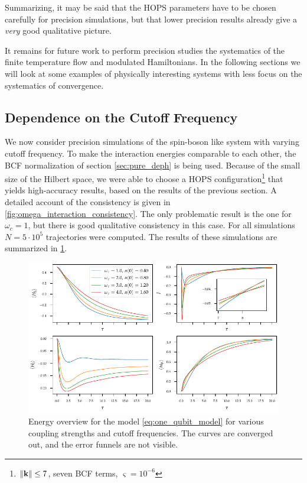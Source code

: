 Summarizing, it may be said that the HOPS parameters have to be chosen
carefully for precision simulations, but that lower precision results
already give a \emph{very} good qualitative picture.

It remains for future work to perform precision studies the
systematics of the finite temperature flow and modulated
Hamiltonians. In the following sections we will look at some examples
of physically interesting systems with less focus on the systematics
of convergence.

\subsection{Dependence on the Cutoff Frequency}
\label{sec:one_bath_cutoff}
We now consider precision simulations of the spin-boson like system
with varying cutoff frequency. To make the interaction energies
comparable to each other, the BCF normalization of section
\cref{sec:pure_deph} is being used. Because of the small size of the
Hilbert space, we were able to choose a HOPS
configuration\footnote{\(\norm{\vb{k}}\leq 7\), seven BCF terms,
  \(\varsigma = 10^{-6}\)} that yields high-accuracy results, based on
the results of the previous section. A detailed account of the
consistency is given in \cref{fig:omega_interaction_consistency}. The
only problematic result is the one for \(ω_c=1\), but there is good
qualitative consistency in this case. For all simulations
\(N=5\cdot 10^{5}\) trajectories were computed. The results of these
simulations are summarized in \cref{fig:omega_systematics_system}.
\begin{figure}[h]
  \centering
  \includegraphics{figs/one_bath_syst/omega_energy_overview}
  \caption{\label{fig:omega_systematics_system} Energy overview for the
    model \cref{eq:one_qubit_model} for various coupling strengths and
     cutoff frequencies. The curves are converged out, and the error
    funnels are not visible.}
\end{figure}

